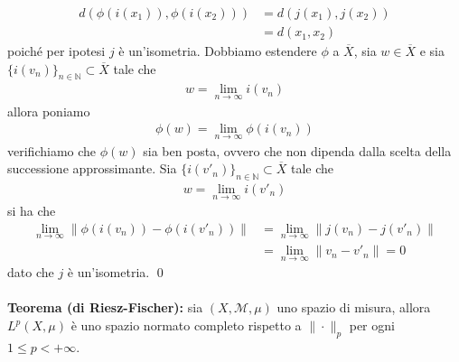 \documentclass{article}
\numberwithin{equation}{subsection}
\begin{document}
\begin{align*}
    d(\phi(i(x_1)), \phi(i(x_2))) &= d(j(x_1), j(x_2))  \\
    &= d(x_1, x_2) 
\end{align*}
poiché per ipotesi $j$ è un'isometria. Dobbiamo estendere $\phi$ a $\overline{X}$, sia $w \in \overline{X}$ e sia $\{i(v_n)\}_{n \in \mathbb{N}} \subset \overline{X}$ tale che 
\begin{align*}
    w = \lim_{n \rightarrow \infty}i(v_n) 
\end{align*}
allora poniamo 
\begin{align*}
    \phi(w) = \lim_{n \rightarrow \infty}\phi(i(v_n)) 
\end{align*}
verifichiamo che $\phi(w)$ sia ben posta, ovvero che non dipenda dalla scelta della successione approssimante. Sia $\{i(v'_n)\}_{n \in \mathbb{N}} \subset \overline{X}$ tale che 
\begin{align*}
    w = \lim_{n \rightarrow \infty}i(v'_n) 
\end{align*}
si ha che 
\begin{align*}
    \lim_{n \rightarrow \infty}\|\phi(i(v_n)) - \phi(i(v'_n))\|  &= \lim_{n \rightarrow \infty}\|j(v_n) - j(v'_n)\|  \\
    &= \lim_{n \rightarrow \infty}\|v_n - v'_n\| = 0 
\end{align*}
dato che $j$ è un'isometria. \qed \\ \\
\textbf{Teorema (di Riesz-Fischer):} sia $(X, \mathcal{M}, \mu)$ uno spazio di misura, allora $L^p(X, \mu)$ è uno spazio normato completo rispetto a $\|\cdot\|_p$ per ogni $1 \leq p < +\infty$. \\
\end{document}

